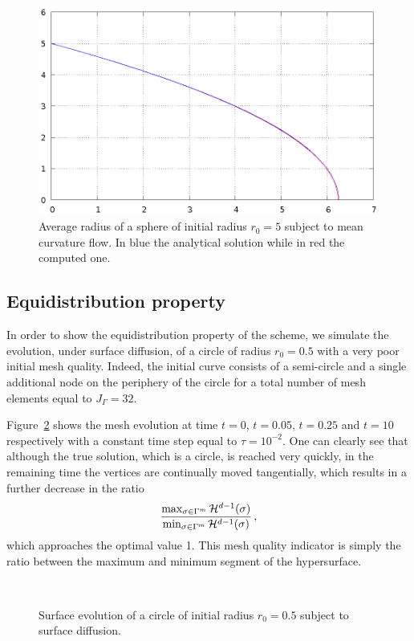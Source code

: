 \begin{figure}[htbp]
\centering
\includegraphics[width=.45\textwidth]
{figures/geometric_pdes/mcf_sphere_radius.ps}
\caption[Mean curvature flow shrinking sphere radius]{Average radius of a
sphere of initial radius $r_0=5$ subject to mean curvature flow. In blue the
analytical solution while in red the computed one.}
\label{fig:mcf_sphere_radius}
\end{figure}

\subsection{Equidistribution property}\label{subsec:sd_circle}
In order to show the equidistribution property of the scheme, we simulate the
evolution, under surface diffusion, of a circle of radius $r_0=0.5$ with a very
poor initial mesh quality. Indeed, the initial curve consists of a semi-circle
and a single additional node on the periphery of the circle for a total number
of mesh elements equal to $J_\Gamma=32$.

Figure~\ref{fig:sd_circle} shows the mesh evolution at time $t=0$, $t=0.05$,
$t=0.25$ and $t=10$ respectively with a constant time step equal to
$\tau=10^{-2}$. One can clearly see that although the true solution, which is a
circle, is reached very quickly, in the remaining time the vertices are
continually moved tangentially, which results in a further decrease in the ratio
\begin{equation}
\frac{\max_{\sigma\in \Gamma^m}\mathcal{H}^{d-1}(\sigma)}
{\min_{\sigma\in\Gamma^m}\mathcal{H}^{d-1}(\sigma)}\,,
\end{equation}
which approaches the optimal value 1. This mesh quality indicator is simply the
ratio between the maximum and minimum segment of the hypersurface.

\begin{figure}[htbp]
\centering
{}
\\
\caption[Surface diffusion equidistribution property]{Surface evolution of a
circle of initial radius $r_0=0.5$ subject to surface diffusion.}
\label{fig:sd_circle}
\end{figure}

